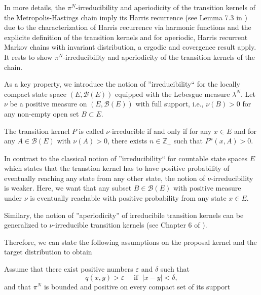 In more details, the $ \pi^{N} $-irreducibility and aperiodicity of the transition kernels of the Metropolis-Hastings chain imply its Harris recurrence (see Lemma 7.3 in \autocite{Robert2005}) due to the characterization of Harris recurrence via harmonic functions and the explicite definition of the transition kernels and for aperiodic, Harris recurrent Markov chains with invariant distribution, a ergodic and covergence result apply. It rests to show $ \pi^{N} $-irreducibility and aperiodicity of the transition kernels of the chain.


As a key property, we introduce the notion of ''irreducibility`` for the locally compact state space $ \left( E, \mathcal{B}(E) \right) $ equipped with the Lebesgue measure $ \lambda^{N} $. Let $ \nu $ be a positive measure on $ \left( E, \mathcal{B}(E) \right) $ with full support, i.e., $ \nu(B) > 0 $ for any non-empty open set $ B \subset E $.

\begin{defin}[$ \nu $-irreducibility]
 The transition kernel $ P $ is called $ \nu $-irreducible if and only if for any $ x \in E $ and for any $ A \in \mathcal{B}(E) $ with $ \nu(A) > 0 $, there exists $ n \in \mathbb{Z}_{+} $ such that $ P^{n} (x,A) > 0 $.
\end{defin}

In contrast to the classical notion of ''irreducibility`` for countable state spaces $E$ which states that the transtion kernel has to have positive probability of eventually reaching any state from any other state, the notion of $ \nu $-irreducibility is weaker. Here, we want that any subset $B \in \mathcal{B}(E) $ with positive measure under $ \nu $ is eventually reachable with positive probability from any state $ x \in E $.

Similary, the notion of ''aperiodicity'' of irreducibile transition kernels can be generalized to $ \nu $-irreducible transition kernels (see Chapter 6 of \autocite{Robert2005}).

Therefore, we can state the following assumptions on the proposal kernel and the target distribution to obtain

Assume that there exist positive numbers $ \varepsilon $ and $ \delta $ such that
\begin{equation}
\label{MH-Convergence-Properties: Assumptions on q}
  q(x,y) > \varepsilon \quad \text{ if } \; | x - y | < \delta,
\end{equation}
and that $ \pi^{N} $ is bounded and positive on every compact set of its support






